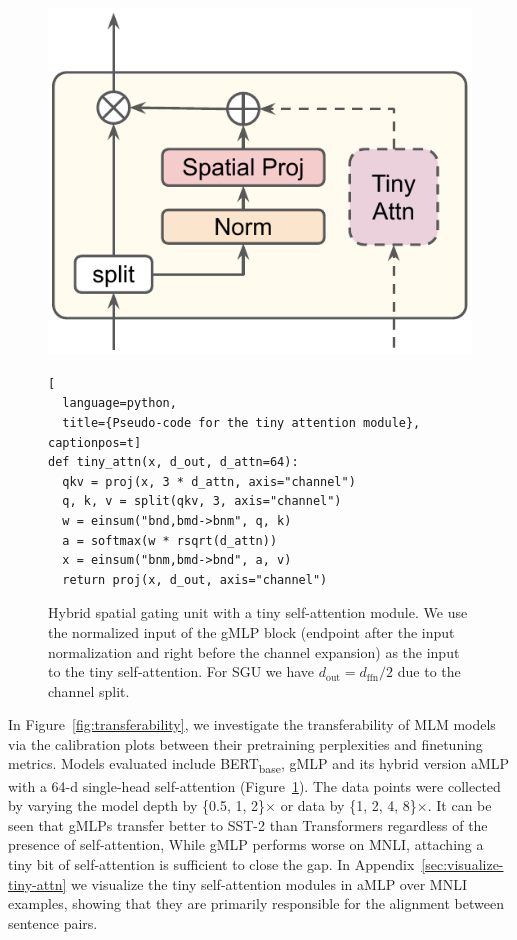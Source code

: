 \documentclass{article}
\newcommand{\gffn}{gMLP\xspace}
\begin{document}
\begin{figure}[h]
    \centering
    \begin{minipage}{0.4\linewidth}
        \includegraphics[width=0.7\linewidth]{figures/tiny-attention.pdf}
    \end{minipage}
    \begin{minipage}{0.5\linewidth}
        \begin{lstlisting}[
  language=python,
  title={Pseudo-code for the tiny attention module}, captionpos=t]
def tiny_attn(x, d_out, d_attn=64):
  qkv = proj(x, 3 * d_attn, axis="channel")
  q, k, v = split(qkv, 3, axis="channel")
  w = einsum("bnd,bmd->bnm", q, k)
  a = softmax(w * rsqrt(d_attn))
  x = einsum("bnm,bmd->bnd", a, v)
  return proj(x, d_out, axis="channel")

\end{lstlisting}
    \end{minipage}
    \caption{Hybrid spatial gating unit with a tiny self-attention module. We use the normalized input of the \gffn block (endpoint after the input normalization and right before the channel expansion) as the input to the tiny self-attention. For SGU we have $d_\mathrm{out} = d_\mathrm{ffn} / 2$ due to the channel split.}
    \label{fig:tiny-attn}
\end{figure}

In Figure~\ref{fig:transferability}, we investigate the transferability of MLM models via the calibration plots between their pretraining perplexities and finetuning metrics.
Models evaluated include BERT\textsubscript{base},
\gffn and its hybrid version aMLP with a 64-d single-head self-attention (Figure~\ref{fig:tiny-attn}).
The data points were collected by varying the model depth by \{0.5, 1, 2\}$\times$ or data by \{1, 2, 4, 8\}$\times$.
It can be seen that \gffn{s} transfer better to SST-2 than Transformers regardless of the presence of self-attention,
While \gffn performs worse on MNLI, attaching a tiny bit of self-attention is sufficient to close the gap.
In Appendix~\ref{sec:visualize-tiny-attn} we visualize the tiny self-attention modules in aMLP over MNLI examples,
showing that they are primarily responsible for the alignment between sentence pairs.
\end{document}
